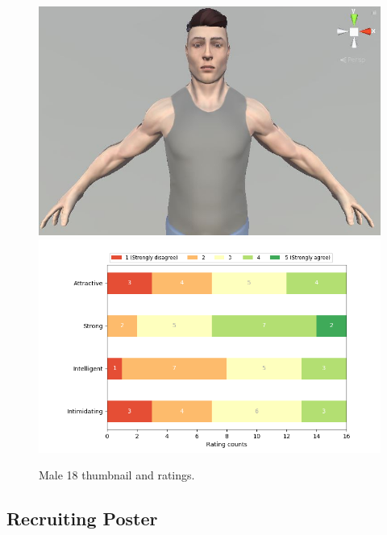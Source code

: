 \begin{figure}[H]
  \includegraphics[width=\linewidth]{Images/Males/18.JPG}
\endminipage\hfill
{}
  \includegraphics[width=\linewidth]{Survey/MRatings/avatar_m18.png}
\endminipage\hfill
\caption{Male 18 thumbnail and ratings.}
\end{figure}

\subsection{Recruiting Poster}
\label{subsection:poster}

